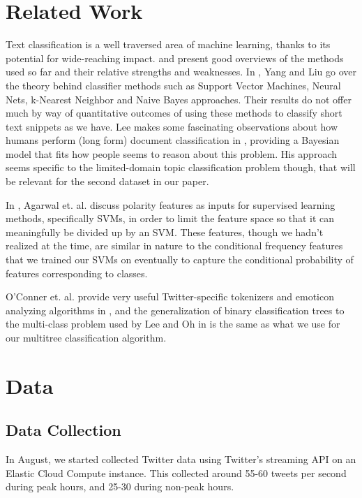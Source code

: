 \documentclass[fontsize=10pt,twocolumn,letterpaper,abstracton]{scrartcl}
\begin{document}
\section{Related Work}

Text classification is a well traversed area of machine learning, thanks to its potential for wide-reaching impact. \cite{textcat} and \cite{seqsampling} present good overviews of the methods used so far and their relative strengths and weaknesses. In \cite{textcat}, Yang and Liu go over the theory behind classifier methods such as Support Vector Machines, Neural Nets, k-Nearest Neighbor and Naive Bayes approaches. Their results do not offer much by way of quantitative outcomes of using these methods to classify short text snippets as we have. Lee makes some fascinating observations about how humans perform (long form) document classification in \cite{seqsampling}, providing a Bayesian model that fits how people seems to reason about this problem. His approach seems specific to the limited-domain topic classification problem though, that will be relevant for the second dataset in our paper.

In \cite{twsenti}, Agarwal et. al. discuss polarity features as inputs for supervised learning methods, specifically SVMs, in order to limit the feature space so that it can meaningfully be divided up by an SVM. These features, though we hadn't realized at the time, are similar in nature to the conditional frequency features that we trained our SVMs on eventually to capture the conditional probability of features corresponding to classes.

O'Conner et. al. provide very useful Twitter-specific tokenizers and emoticon analyzing algorithms in \cite{tweetmotif}, and the generalization of binary classification trees to the multi-class problem used by Lee and Oh in \cite{multitree} is the same as what we use for our multitree classification algorithm.

\section{Data}

\subsection{Data Collection}

In August, we started collected Twitter data using Twitter's streaming API on an Elastic Cloud Compute instance.
This collected around 55-60 tweets per second during peak hours, and 25-30 during non-peak hours. 
\end{document}
